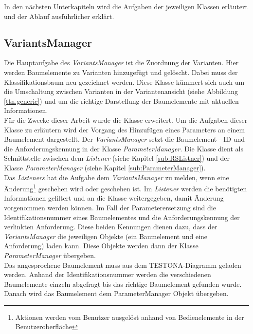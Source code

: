 In den nächsten Unterkapiteln wird die Aufgaben der jeweiligen Klassen erläutert und der Ablauf ausführlicher erklärt.


\subsection{VariantsManager}\label{sub.VariantsManager}
Die Hauptaufgabe des \textit{VariantsManager} ist die Zuordnung der Varianten. Hier werden Baumelemente zu Varianten hinzugefügt und gelöscht. Dabei muss der Klassifikationsbaum neu gezeichnet werden. Diese Klasse kümmert sich auch um die Umschaltung zwischen Varianten in der Variantenansicht (siehe Abbildung \ref{ttn.generic}) und um die richtige Darstellung der Baumelemente mit aktuellen Informationen.\\


Für die  Zwecke dieser Arbeit wurde die Klasse erweitert. Um die Aufgaben dieser Klasse zu erläutern wird der Vorgang des Hinzufügen eines Parameters an einem Baumelement dargestellt. Der \textit{VariantsManager} setzt die Baumelement - ID und die Anforderungskennung in der Klasse \textit{ParameterManager}. Die Klasse dient als Schnittstelle zwischen dem \textit{Listener} (siehe Kapitel \ref{sub:RSListner}) und der Klasse \textit{ParameterManager}  (siehe Kapitel \ref{sub:ParameterManager}).\\


Das \textit{Listeners} hat die Aufgabe dem \textit{VariantsManager} zu melden, wenn eine Änderung\footnote{Aktionen werden vom Benutzer ausgelöst anhand von Bedienelemente in der Benutzeroberfläche} geschehen wird oder geschehen ist. Im \textit{Listener} werden die benötigten Informationen gefiltert und an die Klasse weitergegeben, damit Änderung vorgenommen werden können. Im Fall der Parameterersetzung sind  die Identifikationsnummer eines Baumelementes und die Anforderungskennung der verlinkten Anforderung. Diese beiden Kennungen dienen dazu, dass der \textit{VariantsManager} die jeweiligen Objekte (ein Baumelement und eine Anforderung) laden kann. Diese Objekte werden dann der Klasse \textit{ParameterManager} übergeben.\\


Das angesprochene Baumelement muss aus dem TESTONA-Diagramm geladen werden. Anhand der Identifikationsnummer werden die verschiedenen Baumelemente einzeln abgefragt bis das richtige Baumelement gefunden wurde. Danach wird das Baumelement dem ParameterManager Objekt übergeben.\\


